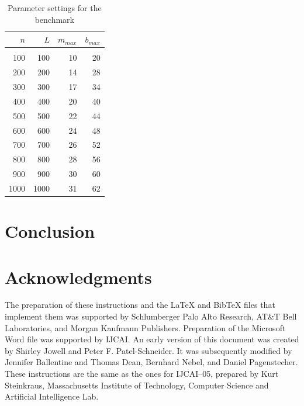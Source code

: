 \documentclass{article}
\begin{document}
\begin{table}
	\caption{Parameter settings for the benchmark}\label{tab:settings}
	\begin{center}
	\begin{tabular}{ r r r r }
		$n$&$L$&$m_{max}$&$b_{max}$\\
		\hline\\
		100&100&10&20\\
		200&200&14&28\\ 
		300&300&17&34\\
		400&400&20&40\\
		500&500&22&44\\
		600&600&24&48\\
		700&700&26&52\\
		800&800&28&56\\
		900&900&30&60\\
		1000&1000&31&62
	\end{tabular}
	\end{center}
\end{table}


\section{Conclusion}

\section*{Acknowledgments}

The preparation of these instructions and the \LaTeX{} and Bib\TeX{}
files that implement them was supported by Schlumberger Palo Alto
Research, AT\&T Bell Laboratories, and Morgan Kaufmann Publishers.
Preparation of the Microsoft Word file was supported by IJCAI.  An
early version of this document was created by Shirley Jowell and Peter
F. Patel-Schneider.  It was subsequently modified by Jennifer
Ballentine and Thomas Dean, Bernhard Nebel, and Daniel Pagenstecher.
These instructions are the same as the ones for IJCAI--05, prepared by
Kurt Steinkraus, Massachusetts Institute of Technology, Computer
Science and Artificial Intelligence Lab.
\end{document}
